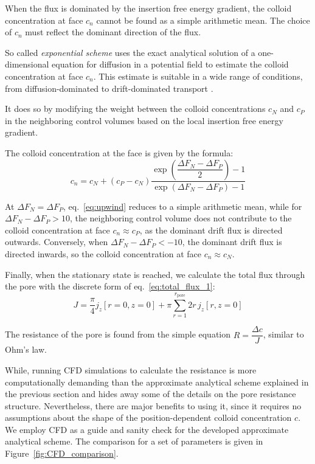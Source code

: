 \documentclass[10pt, a4paper]{article}
\begin{document}
\begin{multicols}{2}
When the flux is dominated by the insertion free energy gradient, the colloid concentration at face $c_n$ cannot be found as a simple arithmetic mean.
The choice of $c_n$ must reflect the dominant direction of the flux.

So called \emph{exponential scheme} uses the exact analytical solution of a one-dimensional equation for diffusion in a potential field to estimate the colloid concentration at face $c_n$.
This estimate is suitable in a wide range of conditions, from diffusion-dominated to drift-dominated transport \cite{Patankar1980,Versteeg2007}.

It does so by modifying the weight between the colloid concentrations $c_N$ and $c_P$ in the neighboring control volumes based on the local insertion free energy gradient.

The colloid concentration at the face is given by the formula:
\begin{equation}
    \label{eq:upwind}
    c_n = c_N + (c_P - c_N) \frac{\exp\left( \dfrac{\Delta F_N - \Delta F_P}{2} \right) - 1}{\exp\left( \Delta F_N - \Delta F_P \right) - 1}
\end{equation}

At $\Delta F_N = \Delta F_P$, eq.~\ref{eq:upwind} reduces to a simple arithmetic mean, while for $\Delta F_N - \Delta F_P > 10$, the neighboring control volume does not contribute to the colloid concentration at face $c_n \approx c_P$, as the dominant drift flux is directed outwards.
Conversely, when $\Delta F_N - \Delta F_P < -10$, the dominant drift flux is directed inwards, so the colloid concentration at face $c_n \approx c_N$.




Finally, when the stationary state is reached, we calculate the total flux through the pore with the discrete form of eq.~\ref{eq:total_flux_1}:
\begin{equation}
    \label{eq:total_flux_2}
    J = \frac{\pi}{4} j_z[ r = 0, z = 0 ] + \pi \sum_{r = 1}^{r_\textrm{pore}} 2 r \, j_z[ r, z = 0 ]
\end{equation}

The resistance of the pore is found from the simple equation $R = \dfrac{\Delta c}{J}$, similar to Ohm's law.

While, running CFD simulations to calculate the resistance is more computationally demanding than the approximate analytical scheme explained in the previous section and hides away some of the details on the pore resistance structure.
Nevertheless, there are major benefits to using it, since it requires no assumptions about the shape of the position-dependent colloid concentration $c$.
We employ CFD as a guide and sanity check for the developed approximate analytical scheme.
The comparison for a set of parameters is given in Figure~\ref{fig:CFD_comparison}.


\end{multicols}
\end{document}
